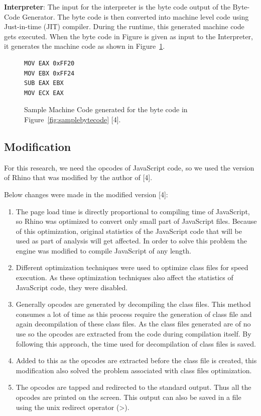 \textbf{Interpreter}: The input for the interpreter is the byte code output of the Byte-Code Generator. The byte code is then converted into machine level code using Just-in-time (JIT) compiler. During the runtime, this generated machine code gets executed. When the byte code in Figure is given as input to the Interpreter, it generates the machine code as shown in Figure~\ref{fig:samplemachinecode}. 
\begin{figure}
  \centering
\begin{lstlisting}[language=myasm] 
MOV EAX 0xFF20
MOV EBX 0xFF24
SUB EAX EBX
MOV ECX EAX
\end{lstlisting}
    \caption[Sample Machine Code]{Sample Machine Code generated for the byte code in Figure~\ref{fig:samplebytecode} [4].}
    \label{fig:samplemachinecode}
\end{figure}
\subsection{Modification}
For this research, we need the opcodes of JavaScript code, so we used the version of Rhino that was modified by the author of [4].
 
Below changes were made in the modified version [4]:

\begin{enumerate}
\item The page load time is directly proportional to compiling time of JavaScript, so Rhino was optimized to convert only small part of JavaScript files. Because of this optimization, original statistics of the JavaScript code that will be used as part of analysis will get affected. In order to solve this problem the engine was modified to compile JavaScript of any length.
\item Different optimization techniques were used to optimize class files for speed execution. As these optimization techniques also affect the statistics of JavaScript code, they were disabled.
\item Generally opcodes are generated by decompiling the class files. This method consumes a lot of time as this process require the generation of class file and again decompilation of these class files. As the class files generated are of no use so the opcodes are extracted from the code during compilation itself. By following this approach, the time used for decompilation of class files is saved.
\item Added to this as the opcodes are extracted before the class file is created, this modification also solved the problem associated with class files optimization.
\item The opcodes are tapped and redirected to the standard output. Thus all the opcodes are printed on the screen. This output can also be saved in a file using the unix redirect operator (>).
\end{enumerate}
 
